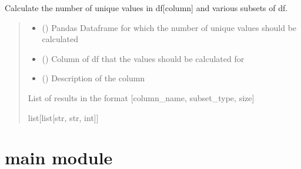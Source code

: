 \documentclass[letterpaper,10pt,english]{sphinxmanual}
\begin{document}
\begin{fulllineitems}
\label{\detokenize{get_stats:get_stats.get_stats_for_column}}
\pysigstartsignatures
{}
\pysigstopsignatures
\sphinxAtStartPar
Calculate the number of unique values in df{[}column{]} and various subsets of df.
\begin{quote}\begin{description}
\begin{itemize}
\item {} 
\sphinxAtStartPar
{} () \textendash{} Pandas Dataframe for which the number of unique values should be calculated

\item {} 
\sphinxAtStartPar
{} () \textendash{} Column of df that the values should be calculated for

\item {} 
\sphinxAtStartPar
{} () \textendash{} Description of the column

\end{itemize}

\sphinxAtStartPar
List of results in the format {[}column\_name, subset\_type, size{]}

\sphinxAtStartPar
list{[}list{[}str, str, int{]}{]}

\end{description}\end{quote}

\end{fulllineitems}


\sphinxstepscope


\section{main module}
\label{\detokenize{main:module-main}}\label{\detokenize{main:main-module}}\label{\detokenize{main::doc}}
\end{document}
